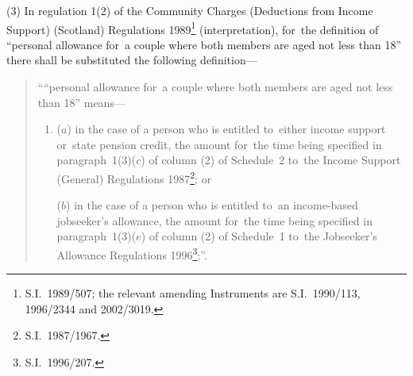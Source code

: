 \documentclass[12pt,a4paper]{article}
\begin{document}
(3) In regulation 1(2) of the Community Charges (Deductions from Income Support) (Scotland) Regulations 1989\footnote{S.I.~1989/507; the relevant amending Instruments are S.I.~1990/113, 1996/2344 and 2002/3019.} (interpretation), for~the definition of “personal allowance for~a couple where both members are aged not less than 18” there shall be substituted the following definition—
\begin{quotation}
““personal allowance for~a couple where both members are aged not less than 18” means—
\begin{enumerate}\item[]
($a$) 
in the case of a person who is entitled to~either income support or~state pension credit, the amount for~the time being specified in paragraph~1(3)($c$)  of column (2) of Schedule~2 to~the Income Support (General) Regulations 1987\footnote{S.I.~1987/1967.}; or

($b$) 
in the case of a person who is entitled to~an income-based jobseeker’s allowance, the amount for~the time being specified in paragraph~1(3)($e$)  of column (2) of Schedule~1 to~the Jobseeker’s Allowance Regulations 1996\footnote{S.I.~1996/207.};”.
\end{enumerate}
\end{quotation}
\end{document}
